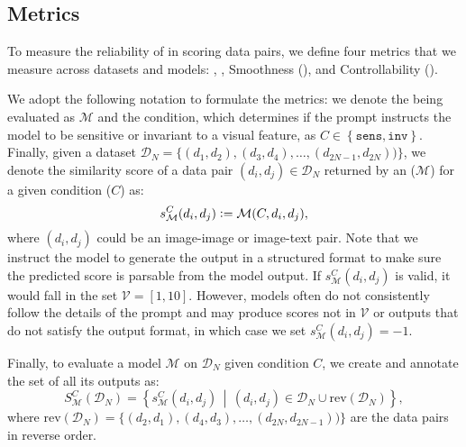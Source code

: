 \subsection{Metrics}
To measure the reliability of \modelss{} in scoring data pairs, we define four metrics that we measure across datasets and models: \nmi, \relaxsym, Smoothness (\smoothness), and Controllability (\control). 


We adopt the following notation to formulate the metrics: we denote the \model{} being evaluated as $\mathcal{M}$ and the condition, which determines if the prompt instructs the model to be sensitive or invariant to a visual feature, as $C \in \left\{\texttt{sens}, \texttt{inv} \right\}$. Finally, given a dataset $\mathcal{D}_N = \{(d_1, d_2), (d_3, d_4), \dots, (d_{2N-1}, d_{2N}))\}$, we denote the similarity score of a data pair $(d_i, d_j) \in \mathcal{D}_N$ returned by an \model{} ($\mathcal{M}$) for a given condition ($C$) as:
$$s_{\mathcal{M}}^{C}(d_i, d_j) \vcentcolon= \mathcal{M}(C, d_i, d_j),$$
where $(d_i, d_j)$ could be an image-image or image-text pair. Note that we instruct the model to generate the output in a structured format to make sure the predicted score is parsable from the model output. If $s_{\mathcal{M}}^{C}(d_i, d_j)$ is valid, it would fall in the set
$\mathcal{V} = [1, 10]$. 
However, models often do not consistently follow the details of the prompt and may produce scores not in $\mathcal{V}$ or outputs that do not satisfy the output format, in which case we set $s_{\mathcal{M}}^{C}(d_i, d_j) = -1$. 

Finally, to evaluate a model $\mathcal{M}$ on $\mathcal{D}_N$ given condition $C$, we create and annotate the set of all its outputs as:
$$S_{\mathcal{M}}^{C}(\mathcal{D}_N) = \left\{ s_{\mathcal{M}}^{C}(d_i, d_j) \,\middle|\, (d_i, d_j) \in \mathcal{D}_N \cup \text{rev}(\mathcal{D}_N) \right\},
$$
where $\text{rev}(\mathcal{D}_N) = \{(d_2, d_1), (d_4, d_3), \dots, (d_{2N}, d_{2N-1}))\}$ are the data pairs in reverse order.



